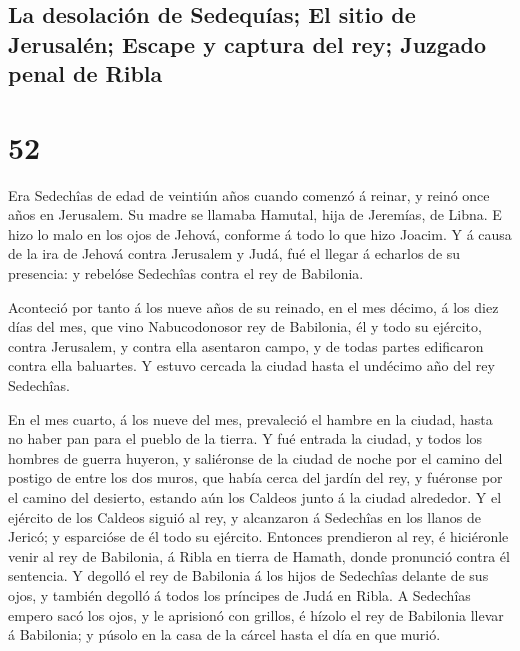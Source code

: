 \hypertarget{la-desolaciuxf3n-de-sedequuxedas-el-sitio-de-jerusaluxe9n-escape-y-captura-del-rey-juzgado-penal-de-ribla}{%
\subsection{La desolación de Sedequías; El sitio de Jerusalén; Escape y
captura del rey; Juzgado penal de
Ribla}\label{la-desolaciuxf3n-de-sedequuxedas-el-sitio-de-jerusaluxe9n-escape-y-captura-del-rey-juzgado-penal-de-ribla}}

\hypertarget{section-51}{%
\section{52}\label{section-51}}

 Era Sedechîas de edad de veintiún años cuando comenzó á
reinar, y reinó once años en Jerusalem. Su madre se llamaba Hamutal,
hija de Jeremías, de Libna.  E hizo lo malo en los ojos de
Jehová, conforme á todo lo que hizo Joacim.  Y á causa de
la ira de Jehová contra Jerusalem y Judá, fué el llegar á echarlos de su
presencia: y rebelóse Sedechîas contra el rey de Babilonia.

 Aconteció por tanto á los nueve años de su reinado, en el
mes décimo, á los diez días del mes, que vino Nabucodonosor rey de
Babilonia, él y todo su ejército, contra Jerusalem, y contra ella
asentaron campo, y de todas partes edificaron contra ella baluartes.
 Y estuvo cercada la ciudad hasta el undécimo año del rey
Sedechîas.

 En el mes cuarto, á los nueve del mes, prevaleció el
hambre en la ciudad, hasta no haber pan para el pueblo de la tierra.
 Y fué entrada la ciudad, y todos los hombres de guerra
huyeron, y saliéronse de la ciudad de noche por el camino del postigo de
entre los dos muros, que había cerca del jardín del rey, y fuéronse por
el camino del desierto, estando aún los Caldeos junto á la ciudad
alrededor.  Y el ejército de los Caldeos siguió al rey, y
alcanzaron á Sedechîas en los llanos de Jericó; y esparcióse de él todo
su ejército.  Entonces prendieron al rey, é hiciéronle
venir al rey de Babilonia, á Ribla en tierra de Hamath, donde pronunció
contra él sentencia.  Y degolló el rey de Babilonia á los
hijos de Sedechîas delante de sus ojos, y también degolló á todos los
príncipes de Judá en Ribla.  A Sedechîas empero sacó los
ojos, y le aprisionó con grillos, é hízolo el rey de Babilonia llevar á
Babilonia; y púsolo en la casa de la cárcel hasta el día en que murió.

